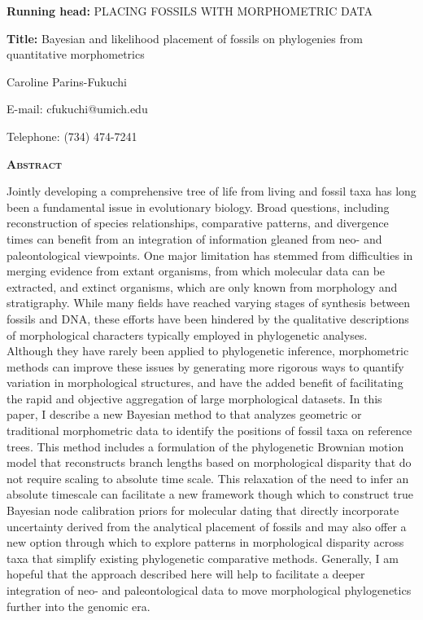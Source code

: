 \documentclass[12pt]{article}
\begin{document}
\setcounter{page}{1}

\noindent \textbf{Running head:} PLACING FOSSILS WITH MORPHOMETRIC DATA

\noindent \textbf{Title:} Bayesian and likelihood placement of fossils on phylogenies from quantitative morphometrics

\noindent Caroline Parins-Fukuchi


\noindent E-mail: cfukuchi@umich.edu

\noindent Telephone: (734) 474-7241

\medskip


\newpage

\noindent \textbf{\textsc{Abstract}}

Jointly developing a comprehensive tree of life  from living and fossil taxa has long been a fundamental issue in evolutionary biology. Broad questions, including reconstruction of species relationships, comparative patterns, and divergence times can  benefit from an integration of information gleaned from neo- and paleontological viewpoints. One major limitation has stemmed from difficulties in merging evidence  from extant organisms, from which molecular data can be extracted, and extinct organisms, which are only known from morphology and stratigraphy.  While many fields have reached varying stages of synthesis between fossils and DNA, these efforts have been hindered by the qualitative descriptions of morphological characters typically employed in phylogenetic analyses. Although they have rarely been applied to phylogenetic inference, morphometric methods can improve these issues by generating more rigorous ways to quantify variation in morphological structures, and have the added benefit of facilitating the rapid and objective aggregation of large morphological datasets. In this paper, I describe a new Bayesian method to that analyzes  geometric or traditional morphometric data to identify the positions of fossil taxa on reference trees. This method includes a formulation of the phylogenetic Brownian motion model that reconstructs branch lengths based on morphological disparity that do not require scaling to absolute time scale. This relaxation of the need to infer an absolute timescale can facilitate a new framework though which to construct true Bayesian node calibration priors for molecular dating that directly incorporate uncertainty derived from the analytical placement of fossils and may also offer a new option through which to explore patterns in morphological disparity across taxa that simplify existing phylogenetic comparative methods. Generally, I am hopeful that the approach described here will help to facilitate a deeper integration of neo- and paleontological data to move morphological phylogenetics further into the genomic era.
\end{document}

